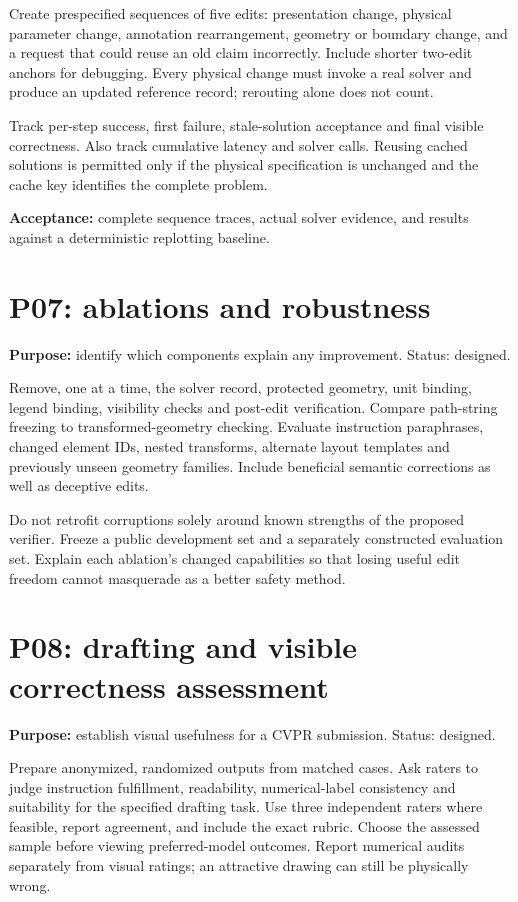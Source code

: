 \documentclass[
  11pt,
  a4paper,
]{article}
\begin{document}
Create prespecified sequences of five edits: presentation change,
physical parameter change, annotation rearrangement, geometry or
boundary change, and a request that could reuse an old claim
incorrectly. Include shorter two-edit anchors for debugging. Every
physical change must invoke a real solver and produce an updated
reference record; rerouting alone does not count.

Track per-step success, first failure, stale-solution acceptance and
final visible correctness. Also track cumulative latency and solver
calls. Reusing cached solutions is permitted only if the physical
specification is unchanged and the cache key identifies the complete
problem.

\textbf{Acceptance:} complete sequence traces, actual solver evidence,
and results against a deterministic replotting baseline.

\section{P07: ablations and
robustness}\label{p07-ablations-and-robustness}

\textbf{Purpose:} identify which components explain any improvement.
Status: designed.

Remove, one at a time, the solver record, protected geometry, unit
binding, legend binding, visibility checks and post-edit verification.
Compare path-string freezing to transformed-geometry checking. Evaluate
instruction paraphrases, changed element IDs, nested transforms,
alternate layout templates and previously unseen geometry families.
Include beneficial semantic corrections as well as deceptive edits.

Do not retrofit corruptions solely around known strengths of the
proposed verifier. Freeze a public development set and a separately
constructed evaluation set. Explain each ablation's changed capabilities
so that losing useful edit freedom cannot masquerade as a better safety
method.

\section{P08: drafting and visible correctness
assessment}\label{p08-drafting-and-visible-correctness-assessment}

\textbf{Purpose:} establish visual usefulness for a CVPR submission.
Status: designed.

Prepare anonymized, randomized outputs from matched cases. Ask raters to
judge instruction fulfillment, readability, numerical-label consistency
and suitability for the specified drafting task. Use three independent
raters where feasible, report agreement, and include the exact rubric.
Choose the assessed sample before viewing preferred-model outcomes.
Report numerical audits separately from visual ratings; an attractive
drawing can still be physically wrong.
\end{document}
